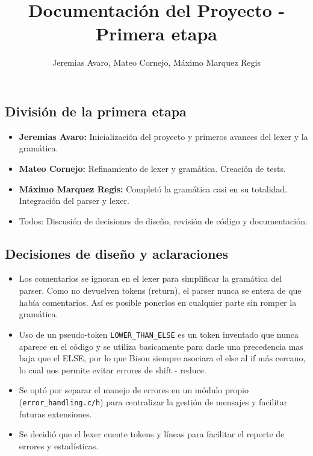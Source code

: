 \documentclass[12pt,a4paper]{article}
\title{Documentación del Proyecto - Primera etapa}
\author{Jeremias Avaro, Mateo Cornejo, Máximo Marquez Regis}
\date{}
\begin{document}
\maketitle

\subsection*{División de la primera etapa}
\begin{itemize}
    \item \textbf{Jeremias Avaro:} Inicialización del proyecto y primeros avances del lexer y la gramática.
    \item \textbf{Mateo Cornejo:} Refinamiento de lexer y gramática. Creación de tests.
    \item \textbf{Máximo Marquez Regis:} Completó la gramática casi en su totalidad. Integración del parser y lexer.
    \item Todos: Discusión de decisiones de diseño, revisión de código y documentación.
\end{itemize}

\subsection*{Decisiones de diseño y aclaraciones}
\begin{itemize}
    \item Los comentarios se ignoran en el lexer para simplificar la gramática del parser. Como no devuelven tokens (return), el parser nunca se entera de que había comentarios. Así es posible ponerlos en cualquier parte sin romper la gramática.
    \item Uso de un pseudo-token \texttt{LOWER\_THAN\_ELSE} es un token inventado que nunca aparece en el código y se utiliza basicamente para darle una precedencia mas baja que el ELSE, por lo que Bison siempre asociara el else al if más cercano, lo cual nos permite evitar errores de shift - reduce.
    \item Se optó por separar el manejo de errores en un módulo propio (\texttt{error\_handling.c/h}) para centralizar la gestión de mensajes y facilitar futuras extensiones.
    \item Se decidió que el lexer cuente tokens y líneas para facilitar el reporte de errores y estadísticas.
\end{itemize}
\end{document}
